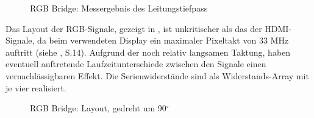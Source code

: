 \begin{figure}[htbp]
 			\caption{RGB Bridge: Messergebnis des Leitungstiefpass}
            \label{fig:teilb_tiefpass_mess}
%
\end{figure}
\newpage
Das Layout der RGB-Signale, gezeigt in , ist unkritischer als das der HDMI-Signale, da beim verwendeten Display ein maximaler Pixeltakt von 33 MHz auftritt (siehe \cite{LG2012}, S.14). Aufgrund der noch relativ langsamen Taktung, haben eventuell auftretende Laufzeitunterschiede zwischen den Signale einen vernachlässigbaren Effekt. Die Serienwiderstände sind als Widerstands-Array mit je vier realisiert.
\begin{figure}[htp]
	\center
 	\caption{RGB Bridge: Layout, gedreht um 90$^{\circ}$} 
    \label{fig:teilb_rgb_bridge_pcb}
\end{figure}

